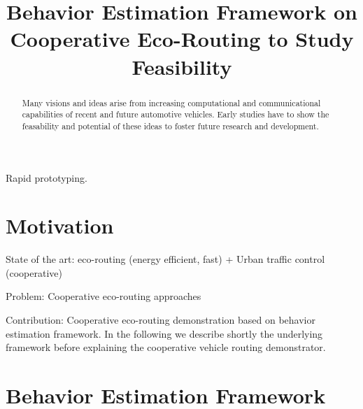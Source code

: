 \documentclass[conference]{../cls/IEEEtran}
\begin{document}
\title{Behavior Estimation Framework on Cooperative Eco-Routing to Study Feasibility}

\author{
	\and
}

\maketitle

\begin{abstract}
Many visions and ideas arise from increasing computational and communicational capabilities of recent and future automotive vehicles.
Early studies have to show the feasability and potential of these ideas to foster future research and development.
\end{abstract}

\begin{IEEEkeywords}
Rapid prototyping.
\end{IEEEkeywords}

\section{Motivation}

State of the art: eco-routing (energy efficient, fast) + Urban traffic control (cooperative)

Problem: Cooperative eco-routing approaches

Contribution: Cooperative eco-routing demonstration based on behavior estimation framework.
In the following we describe shortly the underlying framework before explaining the cooperative vehicle routing demonstrator.

\section{Behavior Estimation Framework}
\end{document}
